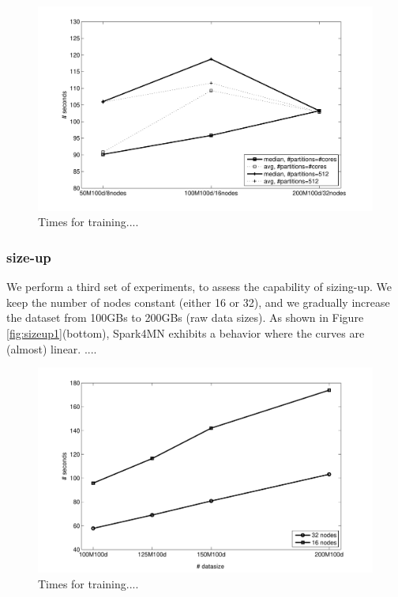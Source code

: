 \documentclass[smallextended]{svjour3}       %
\begin{document}
\begin{figure}[tb!]
\begin{center}
\centerline{\includegraphics[width=0.75\linewidth]{img/scaleup1.pdf}}
\caption{Times for training....}
\label{fig:speedup1}
\end{center}
\vspace{-0.5cm}
\end{figure}

\subsubsection{size-up} We perform a third set of experiments, to assess the capability of sizing-up. We keep the number of nodes constant (either 16 or 32), and we gradually increase the dataset from 100GBs to 200GBs (raw data sizes). As shown in Figure \ref{fig:sizeup1}(bottom), Spark4MN exhibits a behavior where the curves are (almost) linear. ....

\begin{figure}[tb!]
\begin{center}
\centerline{\includegraphics[width=0.75\linewidth]{img/sizeup1.pdf}}
\caption{Times for training....}
\label{fig:speedup1}
\end{center}
\vspace{-0.5cm}
\end{figure}
\end{document}
